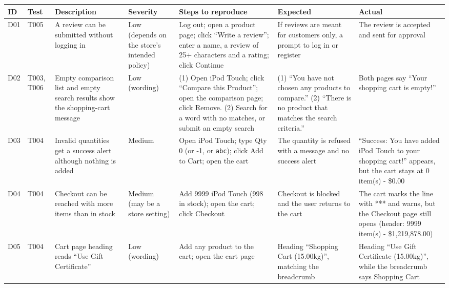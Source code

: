 \documentclass[11pt,a4paper]{article}
\begin{document}
{\small\renewcommand{\arraystretch}{1.25}
\begin{longtable}{|L{0.8cm}|L{1.1cm}|L{3.0cm}|L{1.3cm}|L{3.0cm}|L{2.5cm}|L{2.5cm}|}
\hline
{}\textbf{ID} & \textbf{Test} & \textbf{Description} & \textbf{Severity} & \textbf{Steps to reproduce} & \textbf{Expected} & \textbf{Actual} \\ \hline
\endhead
D01 & T005 & A review can be submitted without logging in & Low (depends on the store's intended policy) & Log out; open a product page; click ``Write a review''; enter a name, a review of 25+ characters and a rating; click Continue & If reviews are meant for customers only, a prompt to log in or register & The review is accepted and sent for approval \\ \hline
D02 & T003, T006 & Empty comparison list and empty search results show the shopping-cart message & Low (wording) & (1) Open iPod Touch; click ``Compare this Product''; open the comparison page; click Remove. (2) Search for a word with no matches, or submit an empty search & (1) ``You have not chosen any products to compare.'' (2) ``There is no product that matches the search criteria.'' & Both pages say ``Your shopping cart is empty!'' \\ \hline
D03 & T004 & Invalid quantities get a success alert although nothing is added & Medium & Open iPod Touch; type Qty 0 (or -1, or \texttt{abc}); click Add to Cart; open the cart & The quantity is refused with a message and no success alert & ``Success: You have added iPod Touch to your shopping cart!'' appears, but the cart stays at 0 item(s) - \$0.00 \\ \hline
D04 & T004 & Checkout can be reached with more items than in stock & Medium (may be a store setting) & Add 9999 iPod Touch (998 in stock); open the cart; click Checkout & Checkout is blocked and the user returns to the cart & The cart marks the line with *** and warns, but the Checkout page still opens (header: 9999 item(s) - \$1,219,878.00) \\ \hline
D05 & T004 & Cart page heading reads ``Use Gift Certificate'' & Low (wording) & Add any product to the cart; open the cart page & Heading ``Shopping Cart (15.00kg)'', matching the breadcrumb & Heading ``Use Gift Certificate (15.00kg)'', while the breadcrumb says Shopping Cart \\ \hline
\end{longtable}}
\end{document}
